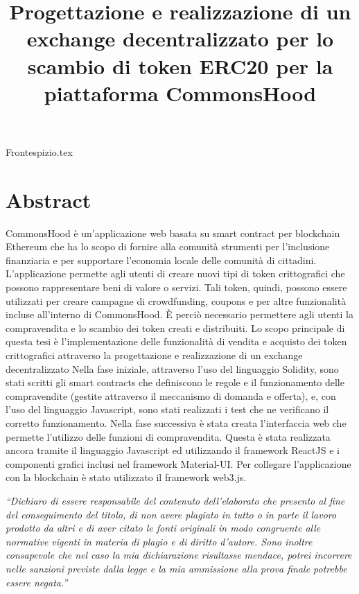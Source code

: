 \documentclass[a4paper]{article}
\title{Progettazione e realizzazione di un exchange decentralizzato per lo scambio di token ERC20 per la piattaforma CommonsHood}
\begin{document}
    {Frontespizio.tex}

    \section*{Abstract}
      CommonsHood è un’applicazione web basata su smart contract per blockchain Ethereum che ha lo scopo di fornire alla comunità strumenti per l’inclusione finanziaria e per supportare l’economia locale delle comunità di cittadini.
      L’applicazione permette agli utenti di creare nuovi tipi di token crittografici che possono rappresentare  beni di valore o servizi. Tali token, quindi, possono essere utilizzati per creare campagne di crowdfunding, coupons e per altre funzionalità incluse all’interno di CommonsHood. È perciò necessario permettere agli utenti la compravendita e lo scambio dei token creati e distribuiti.
      Lo scopo principale di questa tesi è l’implementazione delle funzionalità di vendita e acquisto dei token crittografici attraverso la progettazione e realizzazione di un exchange decentralizzato
      Nella fase iniziale, attraverso l’uso del linguaggio Solidity, sono stati scritti gli smart contracts che definiscono le regole e il funzionamento delle compravendite (gestite attraverso il meccanismo di domanda e offerta), e, con l’uso del linguaggio Javascript, sono stati realizzati i test che ne verificano il corretto funzionamento.
      Nella fase successiva è stata creata l’interfaccia web che permette l’utilizzo delle funzioni di compravendita. Questa è stata realizzata ancora tramite il linguaggio Javascript ed utilizzando il framework ReactJS e i componenti grafici inclusi nel framework Material-UI. Per collegare l’applicazione con la blockchain è stato utilizzato il framework web3.js.

    \newpage
    \tableofcontents
    \newpage
    \begin{midpage}
      \textit{``Dichiaro  di  essere  responsabile  del  contenuto  dell'elaborato  che  presento  al 
      fine  del  conseguimento  del  titolo,  di  non  avere  plagiato  in  tutto  o  in  parte  il 
      lavoro prodotto da altri e di aver citato le fonti originali in modo congruente alle 
      normative  vigenti  in  materia  di  plagio  e  di  diritto  d'autore.  Sono  inoltre 
      consapevole  che  nel  caso  la  mia  dichiarazione  risultasse  mendace,  potrei 
      incorrere  nelle  sanzioni  previste  dalla  legge  e  la  mia  ammissione  alla  prova 
      finale potrebbe essere negata.''}
    \end{midpage}
\end{document}

